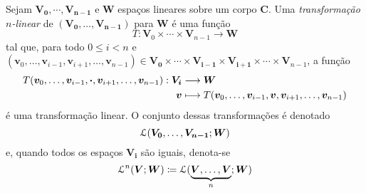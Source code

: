 \begin{defi}
Sejam $\bm{V_0},\cdots,\bm{V_{n-1}}$ e $\bm W$ espaços lineares sobre um corpo $\bm C$. Uma \emph{transformação $n$-linear} de $(\bm{V_0},\ldots,\bm{V_{n-1}})$ para $\bm W$ é uma função
	\begin{equation*}
	T: \bm V_0 \times \cdots \times \bm V_{n-1} \to \bm W
	\end{equation*}
tal que, para todo $0 \leq i < n$ e $(\bm v_0,\ldots,\bm v_{i-1},\bm v_{i+1},\ldots,\bm v_{n-1}) \in \bm{V_0} \times \cdots \times \bm{V_{i-1}} \times \bm{V_{i+1}} \times \cdots \times \bm V_{n-1}$, a função
	\begin{align*}
	{T(\bm v_0,\ldots,\bm v_{i-1},\bm{\cdot},\bm v_{i+1},\ldots,\bm v_{n-1})}: {\bm{V_i}} &\longrightarrow {\bm W} \\{\bm v} &\longmapsto {T(\bm v_0,\ldots,\bm v_{i-1},\bm v,\bm v_{i+1},\ldots,\bm v_{n-1})}
	\end{align*}
é uma transformação linear. O conjunto dessas transformações é denotado
	\begin{equation*}
	\mathcal{L}(\bm{V_0},\ldots,\bm{V_{n-1}};\bm W)
	\end{equation*}
e, quando todos os espaços $\bm{V_i}$ são iguais, denota-se
	\begin{equation*}
	\mathcal{L}^n(\bm V;\bm W) \coloneqq \mathcal{L}(\underbrace{\bm V,\ldots,\bm V}_n;\bm W)
	\end{equation*}
\end{defi}

